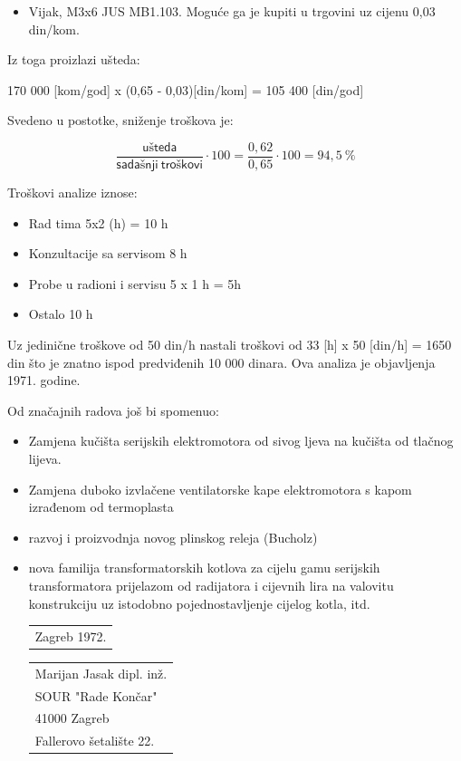 \documentclass[a4paper,12pt]{article}
\numberwithin{figure}{section}
\begin{document}
\begin{itemize}
\item Vijak, M3x6 JUS MB1.103. Moguće ga je kupiti u trgovini uz cijenu 0,03 din/kom.
\end{itemize}
\begin{figure}
  \vspace{-20pt}
  \begin{center}
    
  \end{center}

\end{figure}
\FloatBarrier
Iz toga proizlazi ušteda:
\begin{center}
170 000 [kom/god] x (0,65 - 0,03)[din/kom] = 105 400 [din/god]
\end{center}
Svedeno u postotke, sniženje troškova je:
\begin{center}
\begin{equation*}
\frac{\mathsf{ušteda}}{\mathsf{sadašnji\: troškovi}} \cdot 100 = \frac{0,62}{0,65} \cdot 100 = 94,5\:
\%
\end{equation*}
\end{center}
Troškovi analize iznose:
\begin{itemize}
\item Rad tima 5x2 (h) = 10 h
\item Konzultacije sa servisom 8 h
\item Probe u radioni i servisu 5 x 1 h = 5h
\item Ostalo 10 h
\end{itemize}
Uz jedinične troškove od 50 din/h nastali troškovi od 33 [h] x 50 [din/h] = 1650 din što je znatno ispod predviđenih 10 000 dinara. Ova analiza je objavljenja 1971. godine.\par
Od značajnih radova još bi spomenuo:
\begin{itemize}
\item Zamjena kučišta serijskih elektromotora od sivog ljeva na kučišta od tlačnog lijeva. 
\item Zamjena duboko izvlačene ventilatorske kape elektromotora s kapom izrađenom od termoplasta
\item razvoj i proizvodnja novog plinskog releja (Bucholz)
\item nova familija transformatorskih kotlova za cijelu gamu serijskih transformatora prijelazom od radijatora i cijevnih lira na valovitu konstrukciju uz istodobno pojednostavljenje cijelog kotla, itd.\\


\vfill\noindent
\begin{tabular}[t]{@{}l} 
  Zagreb 1972.
\end{tabular}
\hfill%
\begin{tabular}[t]{l@{}}
Marijan Jasak dipl. inž.\\
SOUR "Rade Končar"\\
41000 Zagreb\\
Fallerovo šetalište 22.
\end{tabular}

\end{itemize}
\end{document}
